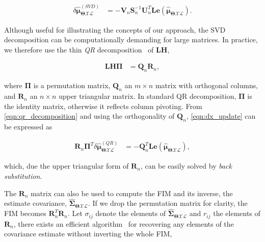 \begin{equation}\label{eqn:dx_svd_solve}
  \begin{aligned}
  \delta\hat{\boldsymbol{\mu}}_{\boldsymbol{\Theta}\mathcal{X}\mathcal{L}}^
    {(SVD)} &=
    -\mathbf{V}_n\mathbf{S}_n^{-1}\mathbf{U}_n^T\mathbf{L}
    \mathbf{e}(
    \mathbf{\hat{\boldsymbol{\mu}}_{
    \boldsymbol{\Theta}\mathcal{X}\mathcal{L}}}).
  \end{aligned}
\end{equation}

Although useful for illustrating the concepts of our approach, the SVD
decomposition can be computationally demanding for large matrices. In practice,
we therefore use the thin \emph{QR} decomposition~\cite{golub96matrix} of
$\mathbf{L}\mathbf{H}$,

\begin{equation}\label{eqn:qr_decomposition}
  \begin{aligned}
  \mathbf{L}\mathbf{H}\boldsymbol{\Pi} &= \mathbf{Q}_n\mathbf{R}_n,
  \end{aligned}
\end{equation}

\noindent where $\boldsymbol{\Pi}$ is a permutation matrix, $\mathbf{Q}_n$ an
$m\times n$ matrix with orthogonal columns, and $\mathbf{R}_n$ an $n\times n$
upper triangular matrix. In standard QR decomposition, $\boldsymbol{\Pi}$ is
the identity matrix, otherwise it reflects column pivoting. From
\eqref{eqn:qr_decomposition} and using the orthogonality of $\mathbf{Q}_n$,
\eqref{eqn:dx_update} can be expressed as

\begin{equation}\label{eqn:dx_qr_solve}
  \begin{aligned}
  \mathbf{R}_n\boldsymbol{\Pi}^{T}
    \delta\hat{\boldsymbol{\mu}}_{\boldsymbol{\Theta}\mathcal{X}\mathcal{L}}^
    {(QR)}&=
    -\mathbf{Q}_n^T \mathbf{L}\mathbf{e}(
    \mathbf{\hat{\boldsymbol{\mu}}_{
    \boldsymbol{\Theta}\mathcal{X}\mathcal{L}}}),
  \end{aligned}
\end{equation}

\noindent which, due the upper triangular form of $\mathbf{R}_n$, can be easily
solved by \emph{back substitution}.

The $\mathbf{R}_n$ matrix can also be used to compute the FIM and its
inverse, the estimate covariance,
$\hat{\boldsymbol{\Sigma}}_{\boldsymbol{\Theta}\mathcal{X}\mathcal{L}}$. If we
drop the permutation matrix for clarity, the FIM becomes
$\mathbf{R}_n^T\mathbf{R}_n$. Let $\sigma_{ij}$ denote the elements of
$\hat{\boldsymbol{\Sigma}}_{\boldsymbol{\Theta}\mathcal{X}\mathcal{L}}$ and
$r_{ij}$ the elements of $\mathbf{R}_n$, there exists an
efficient algorithm~\cite{kaess09covariance} for recovering any elements of the
covariance estimate without inverting the whole FIM,


